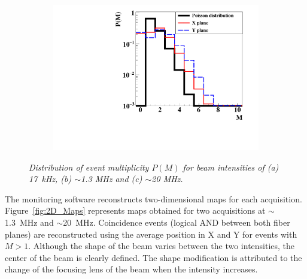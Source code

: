 \documentclass[a4paper,11pt]{article}
\begin{document}
\begin{figure}[htb]
    \begin{subfigure}{0.32\textwidth} \centering \includegraphics[width=\textwidth]{figures/Involved_fibers_20MHz_without_X=0.pdf} \caption{} \label{fig:Fibers_20MHz}
    \end{subfigure}
\caption{\small{\textit{Distribution of event multiplicity $P(M)$ for beam intensities of (a) 17~kHz, (b) $\sim$1.3 MHz and (c) $\sim$20 MHz.}} }
\label{fig:Multiplicity}
\end{figure}

The monitoring software reconstructs two-dimensional maps for each acquisition. Figure~\ref{fig:2D_Maps} represents maps obtained for two acquisitions at $\sim$1.3~MHz and $\sim$20~MHz. Coincidence events (logical AND between both fiber planes) are reconstructed using the  average position in X and Y for events with $M>1$. Although the shape of the beam varies between the two intensities, the center of the beam is clearly defined. The shape modification is attributed to the change of the focusing lens of the beam when the intensity increases. 
\end{document}
